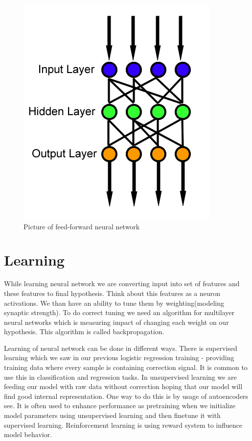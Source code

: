 \begin{figure}[h]
\centering
\includegraphics[scale=0.4]{./pictures/4.png}
\caption{Picture of feed-forward neural network}
\end{figure}

\section{Learning}
While learning neural network we are converting input into set of features and these features to final hypothesis. Think about this features as a neuron activations. We than have an ability to tune them by weighting(modeling synaptic strength). To do correct tuning we need an algorithm for multilayer neural networks which is measuring impact of changing each weight on our hypothesis. This algorithm is called backpropagation.

Learning of neural network can be done in different ways. There is supervised learning which we saw in our previous logistic regression training - providing training data where every sample is containing correction signal. It is common to use this in classification and regression tasks. In unsupervised learning we are feeding our model with raw data without correction hoping that our model will find good internal representation. One way to do this is by usage of autoencoders see. It is often used to enhance performance as pretraining when we initialize model parameters using unsupervised learning and then finetune it with supervised learning. Reinforcement learning is using reward system to influence model behavior.

